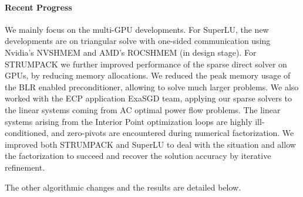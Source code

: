 \paragraph{Recent Progress}

We mainly focus on the multi-GPU developments. For SuperLU, the new developments are
on triangular solve with one-sided communication using Nvidia's NVSHMEM and AMD's
ROCSHMEM (in design stage).
For STRUMPACK we further improved performance of the sparse direct
solver on GPUs, by reducing memory allocations. We reduced the peak
memory usage of the BLR enabled preconditioner, allowing to solve much
larger problems.
We also worked with the ECP application ExaSGD team, applying our sparse solvers to
the linear systems coming from AC optimal power flow problems. The linear systems
arising from the Interior Point optimization loops are highly ill-conditioned,
and zero-pivots are encountered during numerical factorization.
We improved both STRUMPACK and SuperLU to deal with the situation and allow the factorization
to succeed and recover the solution accuracy by iterative refinement.

The other algorithmic changes and the results are detailed below.


